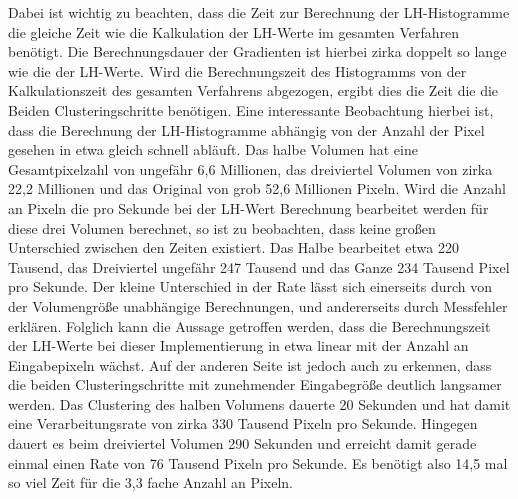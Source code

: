 Dabei ist wichtig zu beachten, dass die Zeit zur Berechnung der LH-Histogramme die gleiche Zeit wie die Kalkulation der LH-Werte im gesamten Verfahren benötigt. Die Berechnungsdauer der Gradienten ist hierbei zirka doppelt so lange wie die der LH-Werte. Wird die Berechnungszeit des Histogramms von der Kalkulationszeit des gesamten Verfahrens abgezogen, ergibt dies die Zeit die die Beiden Clusteringschritte benötigen.
Eine interessante Beobachtung hierbei ist, dass die Berechnung der LH-Histogramme abhängig von der Anzahl der Pixel gesehen in etwa gleich schnell abläuft. Das halbe Volumen hat eine Gesamtpixelzahl von ungefähr 6,6 Millionen, das dreiviertel Volumen von zirka 22,2 Millionen und das Original von grob 52,6 Millionen Pixeln.
\newline
Wird die Anzahl an Pixeln die pro Sekunde bei der LH-Wert Berechnung bearbeitet werden für diese drei Volumen berechnet, so ist zu beobachten, dass keine großen Unterschied zwischen den Zeiten existiert.
Das Halbe bearbeitet etwa 220 Tausend, das Dreiviertel ungefähr 247 Tausend und das Ganze 234 Tausend Pixel pro Sekunde. Der kleine Unterschied in der Rate lässt sich einerseits durch von der Volumengröße unabhängige Berechnungen, und andererseits durch Messfehler erklären. Folglich kann die Aussage getroffen werden, dass die Berechnungszeit der LH-Werte bei dieser Implementierung in etwa linear mit der Anzahl an Eingabepixeln wächst.
Auf der anderen Seite ist jedoch auch zu erkennen, dass die beiden Clusteringschritte mit zunehmender Eingabegröße deutlich langsamer werden. Das Clustering des halben Volumens dauerte 20 Sekunden und hat damit eine Verarbeitungsrate von zirka 330 Tausend Pixeln pro Sekunde. Hingegen dauert es beim dreiviertel Volumen 290 Sekunden und erreicht damit gerade einmal einen Rate von 76 Tausend Pixeln pro Sekunde. Es benötigt also 14,5 mal so viel Zeit für die 3,3 fache Anzahl an Pixeln.














































